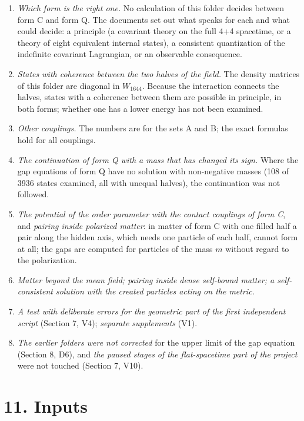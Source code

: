 \documentclass[
  10pt,
]{article}
\providecommand{\tightlist}{%
  \setlength{\itemsep}{0pt}\setlength{\parskip}{0pt}}
\begin{document}
\begin{enumerate}
\def\labelenumi{\arabic{enumi}.}
\tightlist
\item
  \emph{Which form is the right one.} No calculation of this folder
  decides between form C and form Q. The documents set out what speaks
  for each and what could decide: a principle (a covariant theory on the
  full 4+4 spacetime, or a theory of eight equivalent internal states),
  a consistent quantization of the indefinite covariant Lagrangian, or
  an observable consequence.
\item
  \emph{States with coherence between the two halves of the field.} The
  density matrices of this folder are diagonal in \(W_{1644}\). Because
  the interaction connects the halves, states with a coherence between
  them are possible in principle, in both forms; whether one has a lower
  energy has not been examined.
\item
  \emph{Other couplings.} The numbers are for the sets A and B; the
  exact formulas hold for all couplings.
\item
  \emph{The continuation of form Q with a mass that has changed its
  sign.} Where the gap equations of form Q have no solution with
  non-negative masses (108 of 3936 states examined, all with unequal
  halves), the continuation was not followed.
\item
  \emph{The potential of the order parameter with the contact couplings
  of form C}, and \emph{pairing inside polarized matter}: in matter of
  form C with one filled half a pair along the hidden axis, which needs
  one particle of each half, cannot form at all; the gaps are computed
  for particles of the mass \(m\) without regard to the polarization.
\item
  \emph{Matter beyond the mean field; pairing inside dense self-bound
  matter; a self-consistent solution with the created particles acting
  on the metric.}
\item
  \emph{A test with deliberate errors for the geometric part of the
  first independent script} (Section 7, V4); \emph{separate supplements}
  (V1).
\item
  \emph{The earlier folders were not corrected} for the upper limit of
  the gap equation (Section 8, D6), and \emph{the paused stages of the
  flat-spacetime part of the project} were not touched (Section 7, V10).
\end{enumerate}

\hypertarget{inputs}{%
\section{11. Inputs}\label{inputs}}
\end{document}
